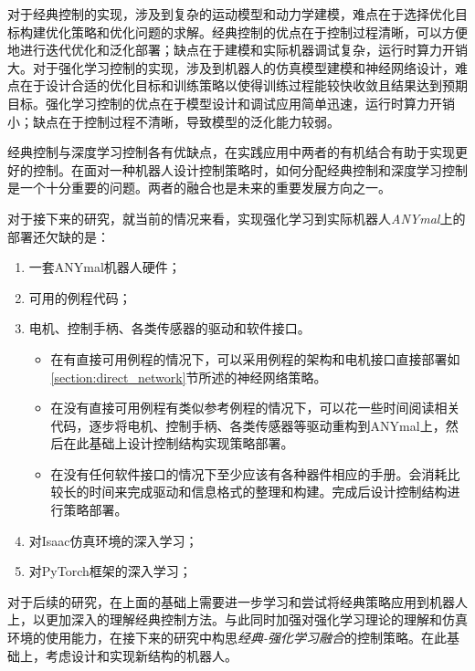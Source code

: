 
\begin{conclusion}

对于经典控制的实现，涉及到复杂的运动模型和动力学建模，难点在于选择优化目标构建优化策略和优化问题的求解。经典控制的优点在于控制过程清晰，可以方便地进行迭代优化和泛化部署；缺点在于建模和实际机器调试复杂，运行时算力开销大。对于强化学习控制的实现，涉及到机器人的仿真模型建模和神经网络设计，难点在于设计合适的优化目标和训练策略以使得训练过程能较快收敛且结果达到预期目标。强化学习控制的优点在于模型设计和调试应用简单迅速，运行时算力开销小；缺点在于控制过程不清晰，导致模型的泛化能力较弱。

经典控制与深度学习控制各有优缺点，在实践应用中两者的有机结合有助于实现更好的控制。在面对一种机器人设计控制策略时，如何分配经典控制和深度学习控制是一个十分重要的问题。两者的融合也是未来的重要发展方向之一。

对于接下来的研究，就当前的情况来看，实现强化学习到实际机器人\emph{ANYmal}上的部署还欠缺的是：
\begin{enumerate}
    \item 一套ANYmal机器人硬件；
    \item 可用的例程代码；
    \item 电机、控制手柄、各类传感器的驱动和软件接口。
    \begin{itemize}
        \item 在有直接可用例程的情况下，可以采用例程的架构和电机接口直接部署如\ref{section:direct_network}节所述的神经网络策略。
        \item 在没有直接可用例程有类似参考例程的情况下，可以花一些时间阅读相关代码，逐步将电机、控制手柄、各类传感器等驱动重构到ANYmal上，然后在此基础上设计控制结构实现策略部署。
        \item 在没有任何软件接口的情况下至少应该有各种器件相应的手册。会消耗比较长的时间来完成驱动和信息格式的整理和构建。完成后设计控制结构进行策略部署。
    \end{itemize}
    \item 对Isaac仿真环境的深入学习；
    \item 对PyTorch框架的深入学习；
\end{enumerate}

对于后续的研究，在上面的基础上需要进一步学习和尝试将经典策略应用到机器人上，以更加深入的理解经典控制方法。与此同时加强对强化学习理论的理解和仿真环境的使用能力，在接下来的研究中构思\emph{经典-强化学习融合}的控制策略。在此基础上，考虑设计和实现新结构的机器人。
\end{conclusion}
